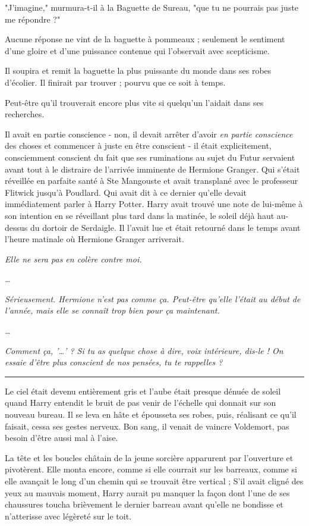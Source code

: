 "J'imagine," murmura-t-il à la Baguette de Sureau, "que tu ne pourrais pas juste me répondre ?"

Aucune réponse ne vint de la baguette à pommeaux ; seulement le sentiment d'une gloire et d'une puissance contenue qui l'observait avec scepticisme.

Il soupira et remit la baguette la plus puissante du monde dans ses robes d'écolier. Il finirait par trouver ; pourvu que ce soit à temps.

Peut-être qu'il trouverait encore plus vite si quelqu'un l'aidait dans ses recherches.

Il avait en partie conscience - non, il devait arrêter d'avoir \emph{en partie conscience}  des choses et commencer à juste en être conscient - il était explicitement, consciemment conscient du fait que ses ruminations au sujet du Futur servaient avant tout à le distraire de l'arrivée imminente de Hermione Granger. Qui s'était réveillée en parfaite santé à Ste Mangouste et avait transplané avec le professeur Flitwick jusqu'à Poudlard. Qui avait dit à ce dernier qu'elle devait immédiatement parler à Harry Potter. Harry avait trouvé une note de lui-même à son intention en se réveillant plus tard dans la matinée, le soleil déjà haut au-dessus du dortoir de Serdaigle. Il l'avait lue et était retourné dans le temps avant l'heure matinale où Hermione Granger arriverait.

\emph{Elle ne sera pas en colère contre moi.} 

\emph{…} 

\emph{Sérieusement. Hermione n'est pas comme ça. Peut-être qu'elle l'était au début de l'année, mais elle se connaît trop bien pour ça maintenant.} 

\emph{…} 

\emph{Comment ça, '…' ? Si tu as quelque chose à dire, voix intérieure, dis-le ! On essaie d'être plus conscient de nos pensées, tu te rappelles ?} 
\par\noindent\rule{\textwidth}{0.4pt}
Le ciel était devenu entièrement gris et l'aube était presque dénuée de soleil quand Harry entendit le bruit de pas venir de l'échelle qui donnait sur son nouveau bureau. Il se leva en hâte et épousseta ses robes, puis, réalisant ce qu'il faisait, cessa ses gestes nerveux. Bon sang, il venait de vaincre Voldemort, pas besoin d'être aussi mal à l'aise.

La tête et les boucles châtain de la jeune sorcière apparurent par l'ouverture et pivotèrent. Elle monta encore, comme si elle courrait sur les barreaux, comme si elle avançait le long d'un chemin qui se trouvait être vertical ; S'il avait cligné des yeux au mauvais moment, Harry aurait pu manquer la façon dont l'une de ses chaussures toucha brièvement le dernier barreau avant qu'elle ne bondisse et n'atterisse avec légèreté sur le toit.

